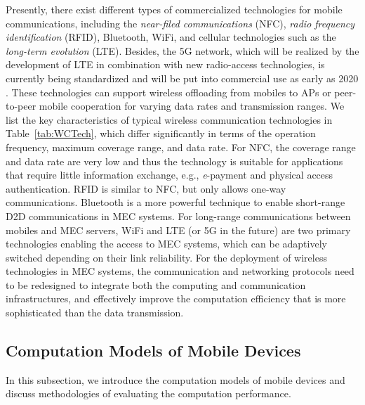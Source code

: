 \documentclass[journal]{IEEEtran}
\begin{document}
Presently, there exist  different types of commercialized  technologies for mobile communications, including the \emph{near-filed communications} (NFC), \emph{radio frequency identification} (RFID),  Bluetooth, WiFi, and cellular technologies such as the \emph{long-term evolution} (LTE). {\color{black}Besides, the 5G network, which will be realized by the development of LTE in combination with new radio-access technologies, is currently being standardized and will be put into commercial use as early as 2020 \cite{ericssonWhitepaper}.} These technologies can support wireless offloading from mobiles to APs or peer-to-peer mobile cooperation for varying data rates and transmission ranges.  We list the key characteristics of typical wireless communication technologies in Table~\ref{tab:WCTech}, which differ significantly in terms of the operation frequency, maximum coverage range, and data rate. For NFC, the coverage range and data rate are very low and thus the technology  is suitable for applications that require little  information exchange, e.g., \emph{e}-payment and physical access authentication. RFID is similar to NFC, but only allows one-way communications. Bluetooth is a more powerful technique to enable short-range D2D communications in MEC systems. For long-range communications between mobiles and  MEC servers, WiFi and LTE {\color{black}(or 5G in the future)} are two primary technologies enabling the access to MEC systems, which can be adaptively switched depending on their link reliability.  For the deployment of wireless technologies in MEC systems, the communication and networking protocols need to be redesigned to integrate both the computing and  communication infrastructures, and effectively improve the computation efficiency that is more sophisticated than the data transmission.




\subsection{Computation Models of Mobile Devices}\label{Sec:ModelMD}

In this subsection, we introduce the computation models of mobile devices and discuss methodologies of evaluating the computation performance.
\end{document}
